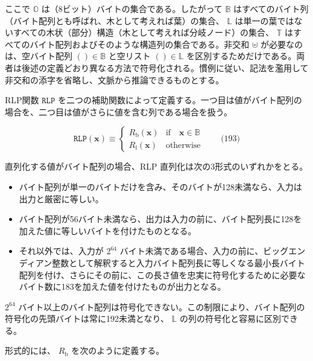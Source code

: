 \documentclass[
]{ltjsarticle}
\begin{document}
ここで \(\mathbb{O}\) は（8ビット）バイトの集合である。したがって
\(\mathbb{B}\)
はすべてのバイト列（バイト配列とも呼ばれ、木として考えれば葉）の集合、
\(\mathbb{L}\)
は単一の葉ではないすべての木状（部分）構造（木として考えれば分岐ノード）の集合、
\(\mathbb{T}\)
はすべてのバイト配列およびそのような構造列の集合である。非交和
\(\uplus\) が必要なのは、空バイト配列 \(()\in\mathbb{B}\) と空リスト
\(()\in\mathbb{L}\)
を区別するためだけである。両者は後述の定義どおり異なる方法で符号化される。慣例に従い、記法を濫用して非交和の添字を省略し、文脈から推論できるものとする。

RLP関数 \(\mathtt{RLP}\)
を二つの補助関数によって定義する。一つ目は値がバイト配列の場合を、二つ目は値がさらに値を含む列である場合を扱う。

\protect\hypertarget{eq-193}{}{}

\[\mathtt{RLP}(\mathbf{x}) \equiv \begin{cases} R_{\mathrm{b}}(\mathbf{x}) & \text{if} \quad \mathbf{x} \in \mathbb{B} \\ R_{\mathrm{l}}(\mathbf{x}) & \text{otherwise} \end{cases} \qquad \text{(193)}\]

\hypertarget{RLP_serialisation_of_a_byte_array_R__b_word_def}{}

直列化する値がバイト配列の場合、RLP 直列化は次の3形式のいずれかをとる。

\begin{itemize}
\item
  バイト配列が単一のバイトだけを含み、そのバイトが128未満なら、入力は出力と厳密に等しい。
\item
  バイト配列が56バイト未満なら、出力は入力の前に、バイト配列長に128を加えた値に等しいバイトを付けたものとなる。
\item
  それ以外では、入力が \(2^{64}\)
  バイト未満である場合、入力の前に、ビッグエンディアン整数として解釈すると入力バイト配列長に等しくなる最小長バイト配列を付け、さらにその前に、この長さ値を忠実に符号化するために必要なバイト数に183を加えた値を付けたものが出力となる。
\end{itemize}

\(2^{64}\)
バイト以上のバイト配列は符号化できない。この制限により、バイト配列の符号化の先頭バイトは常に192未満となり、
\(\mathbb{L}\) の列の符号化と容易に区別できる。

\hypertarget{RLP_serialisation_of_a_byte_array_R__b_math_def}{}

形式的には、 \(R_{\mathrm{b}}\) を次のように定義する。
\end{document}
